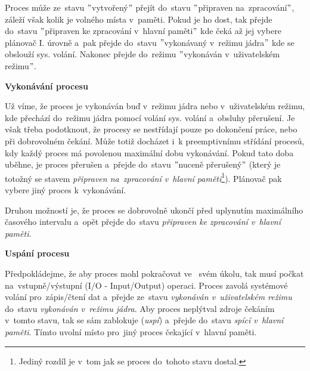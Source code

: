 \vspace{0,5cm}

Proces může ze~stavu $"$vytvořený$"$ přejít do~stavu $"$připraven na~zpracování$"$, záleží však kolik je volného místa v~paměti. Pokud je ho dost, tak přejde do~stavu $"$připraven ke zpracování v~hlavní paměti$"$ kde čeká až jej vybere plánovač I. úrovně a~pak přejde do~stavu $"$vykonávaný v~režimu jádra$"$ kde se obslouží sys. volání. Nakonec přejde do~režimu $"$vykonáván v~uživatelském režimu$"$.

\begin{large}
    \vspace{0,5cm}
    \textbf{Vykonávání procesu}
\end{large}

Už víme, že proces je vykonáván buď v~režimu jádra nebo v~uživatelském režimu, kde přechází do~režimu jádra pomocí volání sys. volání a~obsluhy přerušení. Je však třeba podotknout, že procesy se nestřídají pouze po dokončení práce, nebo při dobrovolném čekání. Může totiž docházet i~k preemptivnímu střídání procesů, kdy každý proces má povolenou maximální dobu vykonávání. Pokud tato doba uběhne, je proces přerušen a~přejde do~stavu $"$nuceně přerušený$"$ (který je totožný se stavem \emph{připraven na~zpracování v~hlavní paměti}\footnote{Jediný rozdíl je v~tom jak se proces do~tohoto stavu dostal.}). Plánovač pak vybere jiný proces k~vykonávání. 

\vspace{0,5cm}

Druhou možností je, že proces se dobrovolně ukončí před uplynutím maximálního časového intervalu a~opět přejde do~stavu \emph{připraven ke zpracování v~hlavní paměti}.

\begin{large}
    \vspace{0,5cm}
    \textbf{Uspání procesu}
\end{large}

Předpokládejme, že aby proces mohl pokračovat ve~ svém úkolu, tak musí počkat na~vstupně/výstupní (I/O - Input/Output) operaci. Proces zavolá systémové volání pro~zápis/čtení dat a~přejde ze~stavu \emph{vykonáván v~uživatelském režimu} do~stavu \emph{vykonáván v~režimu jádra}. Aby proces neplýtval zdroje čekáním v~tomto stavu, tak se sám zablokuje (\emph{uspí}) a~přejde do~stavu \emph{spící v~hlavní paměti}. Tímto uvolní místo pro~jiný proces čekající v~hlavní paměti. 

\vspace{0,5cm}

